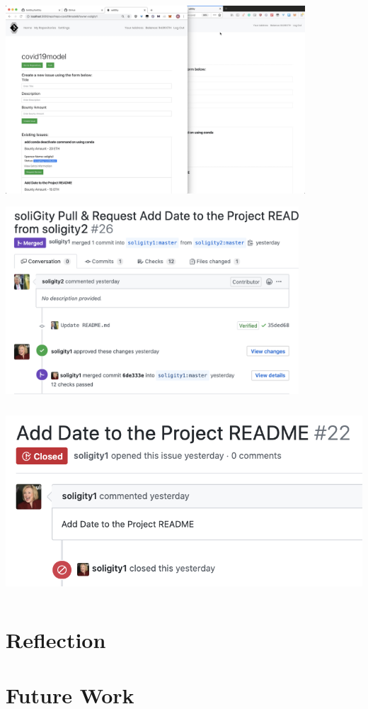 \documentclass[12pt]{article}
\renewcommand{\_}{\kern-1.5pt\textunderscore\kern-1.5pt}
\begin{document}
\includegraphics[height=7cm]{graphs/43. bob_balance_updated}

\includegraphics[height=7cm]{graphs/44. pull_request_closed}

\includegraphics[height=7cm]{graphs/45. issue_closed}



\section{Reflection}


\section{Future Work}
\end{document}
